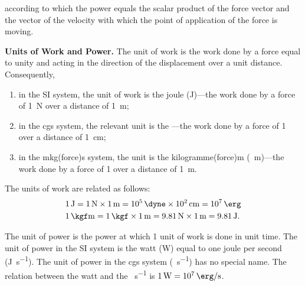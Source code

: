 \noindent
according to which the power equals the scalar product of the force vector and the vector of the velocity with which the point of application of the force is moving.

\textbf{Units of Work and Power.} The unit of work is the work done by a force equal to unity and acting in the direction of the displacement over a unit distance. Consequently,
\begin{enumerate}[(1)]
	\item in the SI system, the unit of work is the joule (\si{\joule})---the work done by a force of \SI{1}{\newton} over a distance of \SI{1}{\metre};
	\item in the cgs system, the relevant unit is the \si{\erg}---the work done by a force of \SI{1}{\dyne} over a distance of \SI{1}{\centi\metre};
	\item in the mkg(force)s system, the unit is the kilogramme(force)m (\si{\kgf\metre})---the work done by a force of \SI{1}{\kgf} over a distance of \SI{1}{\metre}.
\end{enumerate}

The units of work are related as follows:
\begin{align*}
&\SI{1}{\joule} = \SI{1}{\newton}\times\SI{1}{\metre} = \SI{e5}{\dyne}\times\SI{e2}{\centi\metre} = \SI{e7}{\erg}\\
&\SI{1}{\kgf\metre} = \SI{1}{\kgf}\times\SI{1}{\metre} = \SI{9.81}{\newton}\times\SI{1}{\metre} = \SI{9.81}{\joule}.
\end{align*}

The unit of power is the power at which 1 unit of work is done in unit time. The unit of power in the SI system is the watt (\si{\watt}) equal to one joule per second (\si{\joule\per\second}). The unit of power in the cgs system (\si{\erg\per\second}) has no special name. The relation between the watt and the \si{\erg\per\second} is $\SI{1}{\watt}=\SI{e7}{\erg\per\second}$.

